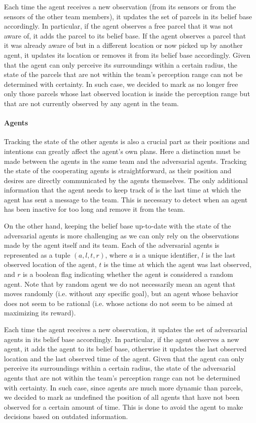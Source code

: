 Each time the agent receives a new observation (from its sensors or from the sensors of the other team members), it updates the set of parcels in its belief base accordingly. In particular, if the agent observes a free parcel that it was not aware of, it adds the parcel to its belief base. If the agent observes a parcel that it was already aware of but in a different location or now picked up by another agent, it updates its location or removes it from its belief base accordingly. Given that the agent can only perceive its surroundings within a certain radius, the state of the parcels that are not within the team's perception range can not be determined with certainty. In such case, we decided to mark as no longer free only those parcels whose last observed location is inside the perception range but that are not currently observed by any agent in the team.

\paragraph*{Agents}
Tracking the state of the other agents is also a crucial part as their positions and intentions can greatly affect the agent's own plans. Here a distinction must be made between the agents in the same team and the adversarial agents. Tracking the state of the cooperating agents is straightforward, as their position and desires are directly communicated by the agents themselves. The only additional information that the agent needs to keep track of is the last time at which the agent has sent a message to the team. This is necessary to detect when an agent has been inactive for too long and remove it from the team.

On the other hand, keeping the belief base up-to-date with the state of the adversarial agents is more challenging as we can only rely on the observations made by the agent itself and its team. Each of the adversarial agents is represented as a tuple $(a, l, t, r)$, where $a$ is a unique identifier, $l$ is the last observed location of the agent, $t$ is the time at which the agent was last observed, and $r$ is a boolean flag indicating whether the agent is considered a random agent. Note that by random agent we do not necessarily mean an agent that moves randomly (i.e. without any specific goal), but an agent whose behavior does not seem to be rational (i.e. whose actions do not seem to be aimed at maximizing its reward).

Each time the agent receives a new observation, it updates the set of adversarial agents in its belief base accordingly. In particular, if the agent observes a new agent, it adds the agent to its belief base, otherwise it updates the last observed location and the last observed time of the agent. Given that the agent can only perceive its surroundings within a certain radius, the state of the adversarial agents that are not within the team's perception range can not be determined with certainty. In such case, since agents are much more dynamic than parcels, we decided to mark as undefined the position of all agents that have not been observed for a certain amount of time. This is done to avoid the agent to make decisions based on outdated information.

